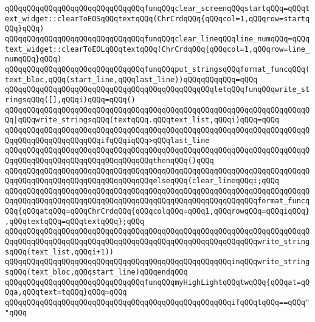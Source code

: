 \newline
\verb|qQQqqQQqqQQqqQQqqQQqqQQqqQQqqQQqfunqQQqclear_screenqQQqstartqQQq=qQQqtext_widget::clearToEOSqQQqtextqQQq(ChrCrdqQQq{qQQqcol=1,qQQqrow=startqQQq}qQQq)|\newline
\newline
\verb|qQQqqQQqqQQqqQQqqQQqqQQqqQQqqQQqfunqQQqclear_lineqQQqline_numqQQq=qQQqtext_widget::clearToEOLqQQqtextqQQq(ChrCrdqQQq{qQQqcol=1,qQQqrow=line_numqQQq}qQQq)|\newline
\verb|qQQqqQQqqQQqqQQqqQQqqQQqqQQqqQQqfunqQQqput_stringsqQQqformat_funcqQQq(text_bloc,qQQq(start_line,qQQqlast_line))qQQqqQQqqQQq=qQQq|\newline
\verb|qQQqqQQqqQQqqQQqqQQqqQQqqQQqqQQqqQQqqQQqqQQqqQQqletqQQqfunqQQqwrite_stringsqQQq([],qQQqi)qQQq=qQQq()|\newline
\verb|qQQqqQQqqQQqqQQqqQQqqQQqqQQqqQQqqQQqqQQqqQQqqQQqqQQqqQQqqQQqqQQqqQQqqQQq|\verb#|qQQqwrite_stringsqQQq(textqQQq.qQQqtext_list,qQQqi)qQQq=qQQq#\newline
\verb|qQQqqQQqqQQqqQQqqQQqqQQqqQQqqQQqqQQqqQQqqQQqqQQqqQQqqQQqqQQqqQQqqQQqqQQqqQQqqQQqqQQqqQQqqQQqifqQQqiqQQq>qQQqlast_line|\newline
\verb|qQQqqQQqqQQqqQQqqQQqqQQqqQQqqQQqqQQqqQQqqQQqqQQqqQQqqQQqqQQqqQQqqQQqqQQqqQQqqQQqqQQqqQQqqQQqqQQqqQQqqQQqthenqQQq()qQQq|\newline
\verb|qQQqqQQqqQQqqQQqqQQqqQQqqQQqqQQqqQQqqQQqqQQqqQQqqQQqqQQqqQQqqQQqqQQqqQQqqQQqqQQqqQQqqQQqqQQqqQQqqQQqqQQqelseqQQq(clear_lineqQQqi;qQQq|\newline
\verb|qQQqqQQqqQQqqQQqqQQqqQQqqQQqqQQqqQQqqQQqqQQqqQQqqQQqqQQqqQQqqQQqqQQqqQQqqQQqqQQqqQQqqQQqqQQqqQQqqQQqqQQqqQQqqQQqqQQqqQQqqQQqqQQqformat_funcqQQq{qQQqatqQQq=qQQqChrCrdqQQq{qQQqcolqQQq=qQQq1,qQQqrowqQQq=qQQqiqQQq},qQQqtextqQQq=qQQqtextqQQq};qQQq|\newline
\verb|qQQqqQQqqQQqqQQqqQQqqQQqqQQqqQQqqQQqqQQqqQQqqQQqqQQqqQQqqQQqqQQqqQQqqQQqqQQqqQQqqQQqqQQqqQQqqQQqqQQqqQQqqQQqqQQqqQQqqQQqqQQqqQQqwrite_stringsqQQq(text_list,qQQqi+1))|\newline
\verb|qQQqqQQqqQQqqQQqqQQqqQQqqQQqqQQqqQQqqQQqqQQqqQQqqQQqinqQQqwrite_stringsqQQq(text_bloc,qQQqstart_line)qQQqendqQQq|\newline
\newline
\verb|qQQqqQQqqQQqqQQqqQQqqQQqqQQqqQQqfunqQQqmyHighLightqQQqtwqQQq{qQQqat=qQQqa,qQQqtext=tqQQq}qQQq=qQQq|\newline
\verb|qQQqqQQqqQQqqQQqqQQqqQQqqQQqqQQqqQQqqQQqqQQqqQQqqQQqifqQQqtqQQq==qQQq""qQQq|\newline
